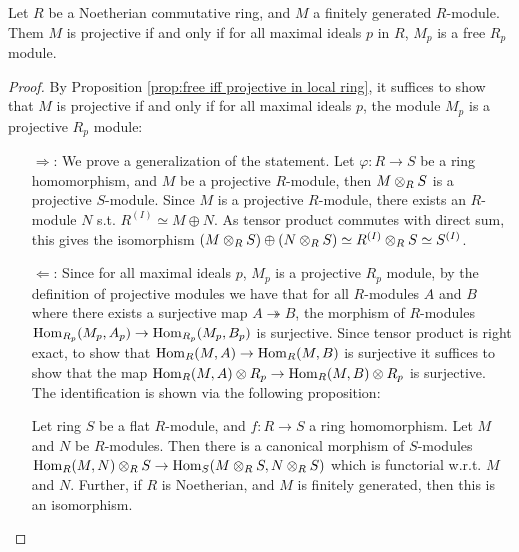 \begin{corollary}
    Let $R$ be a Noetherian commutative ring, and $M$ a finitely generated $R$-module. Them $M$ is projective if and only if for all maximal ideals $p$ in $R$, $M_p$ is a free $R_p$ module.
\end{corollary}

\begin{proof}
    By Proposition \ref{prop:free iff projective in local ring}, it suffices to show that $M$ is projective if and only if for all maximal ideals $p$, the module $M_p$ is a projective $R_p$ module:
    \begin{enumerate}
        \item[$\Rightarrow$:] We prove a generalization of the statement. Let $\varphi: R \to S$ be a ring homomorphism, and $M$ be a projective $R$-module, then $M \otimes_R S$ is a projective $S$-module. Since $M$ is a projective $R$-module, there exists an $R$-module $N$ s.t. $R^{(I)} \simeq M \oplus N$. As tensor product commutes with direct sum, this gives the isomorphism $(M \otimes_R S) \oplus (N \otimes_R S) \simeq R^{(I)} \otimes_R S \simeq S^{(I)}$.
        \item[$\Leftarrow$:] Since for all maximal ideals $p$, $M_p$ is a projective $R_p$ module, by the definition of projective modules we have that for all $R$-modules $A$ and $B$ where there exists a surjective map $A \twoheadrightarrow B$, the morphism of $R$-modules $\mathrm{Hom}_{R_p} (M_p, A_p) \to \mathrm{Hom}_{R_p}(M_p, B_p)$ is surjective. Since tensor product is right exact, to show that $\mathrm{Hom}_R(M, A) \to \mathrm{Hom}_R(M, B)$ is surjective it suffices to show that the map $\mathrm{Hom}_R(M, A) \otimes R_p \to \mathrm{Hom}_R(M, B) \otimes R_p$ is surjective. The identification is shown via the following proposition:

        \begin{proposition}
            Let ring $S$ be a flat $R$-module, and $f: R \to S$ a ring homomorphism. Let $M$ and $N$ be $R$-modules. Then there is a canonical morphism of $S$-modules $\mathrm{Hom}_R(M, N) \otimes_R S \to \mathrm{Hom}_S(M \otimes_R S, N \otimes_R S)$ which is functorial w.r.t. $M$ and $N$. Further, if $R$ is Noetherian, and $M$ is finitely generated, then this is an isomorphism.
        \end{proposition}


\end{enumerate}
\end{proof}
